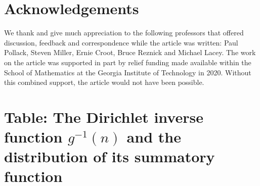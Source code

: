 \documentclass[11pt,reqno,a4letter]{article}
\numberwithin{figure}{section}
\numberwithin{table}{section}
\theoremstyle{plain}
\numberwithin{theorem}{section}
\theoremstyle{definition}
\begin{document}
\section*{Acknowledgements}

We thank and give much appreciation to the following professors that offered 
discussion, feedback and correspondence while the article was written: 
Paul Pollack, Steven Miller, Ernie Croot, Bruce Reznick and Michael Lacey. 
The work on the article was supported in part by 
relief funding made available within the School of Mathematics at the 
Georgia Institute of Technology in 2020. 
Without this combined support, the article would not have been possible.

\newpage 
\renewcommand{\refname}{References} 
{}


\newpage
\label{Appendix_Glossary_NotationConvs}
     \vskip 0in
     \printglossary[type={symbols},
                    title={Glossary of notation and conventions},
                    style={glossstyleSymbol},
                    nogroupskip=true]

\newpage
\setcounter{section}{0} 
\renewcommand{\thesection}{T.\arabic{section}} 

\section{Table: The Dirichlet inverse function $g^{-1}(n)$ and the 
         distribution of its summatory function} 
\label{table_conjecture_Mertens_ginvSeq_approx_values}
\end{document}

